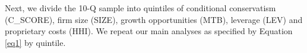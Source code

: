 \documentclass[letterpaper,12pt]{article}
\begin{document}
\begin{spacing}{1.5}
\begin{comment}
Specifically, we run the following cross-sectional model for each fiscal year from 1993 to 2015:
\begin{equation} \label{eq3}
\begin{split}
EARN_{i,t} = \beta_0&+\beta_1NEG_{i,t}+\beta_2RET_{i,t}\\
&+\beta_3RET_{i,t}\times SIZE_{i,t}+\beta_4RET_{i,t}\times MTB_{i,t}+\beta_5RET_{i,t}\times LEV_{i,t}+\beta_6RET_{i,t}\times NEG_{i,t}\\
&+\beta_7RET_{i,t}\times NEG_{i,t}\times SIZE_{i,t}+\beta_8RET_{i,t}\times NEG_{i,t}\times MTB_{i,t}+\beta_9RET_{i,t}\times NEG_{i,t}\times LEV_{i,t}\\
&+\beta_{10}SIZE_{i,t}+\beta_{11}MTB_{i,t}+\beta_{12}LEV_{i,t}\\
&+\beta_{13}NEG_{i,t}\times SIZE_{i,t}+\beta_{14}NEG_{i,t}\times MTB_{i,t}+\beta_{15}NEG_{i,t}\times LEV_{i,t}+ \epsilon_{i,t}
\end{split}
\end{equation}
We obtain the estimates from Equation (3) and use them to calculate C\_SCORE and G\_SCORE following Equation (4) and Equation (5) respectively. C\_SCORE captures the incremental timeliness of bad news and measures conditional conservatism, with more positive value being more conditionally conservative. G\_SCORE captures the timeliness of good news.
\begin{equation}\label{eq4}
C\_SCORE_{i,t} = \beta_6+\beta_7SIZE_{i,t}+\beta_8MTB_{i,t}+\beta_9LEV_{i,t}
\end{equation}
\begin{equation}\label{eq5}
G\_SCORE_{i,t} = \beta_2+\beta_3SIZE_{i,t}+\beta_4MTB_{i,t}+\beta_5LEV_{i,t}
\end{equation}

The mean and standard errors of coefficients obtained from \hyperref[eq3]{Equation (3)} and the summary statistics of C\_SCORE and G\_SCORE (see \hyperref[oat2]{Table 2 of Online Appendix}) are consistent with \citeA{khanEstimationEmpiricalProperties2009} overall. 
\end{comment}
Next, we divide the 10-Q sample into quintiles of conditional conservatism (C\_SCORE), firm size (SIZE), growth opportunities (MTB), leverage (LEV) and proprietary costs (HHI). We repeat our main analyses as specified by Equation \eqref{eq1} by quintile.


\end{spacing}
\end{document}
